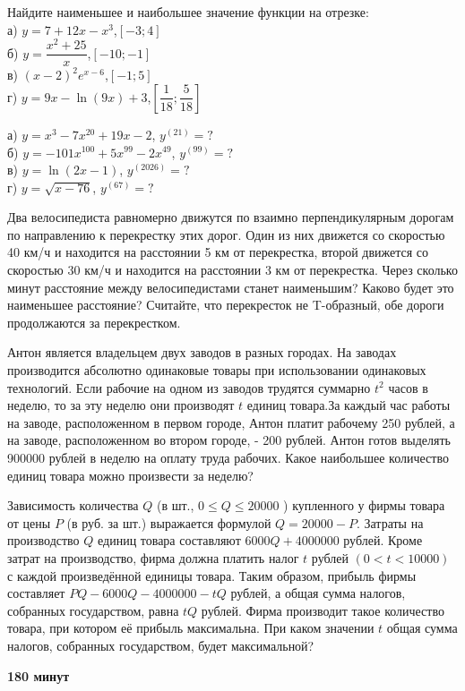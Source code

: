 \newpage


 Найдите наименьшее и наибольшее значение функции на отрезке:\\
а) $y=7+12 x-x^3$,$[-3 ; 4]$\\
б) $y=\dfrac{x^2+25}{x}$,$[-10 ; -1]$\\
в) $(x-2)^2 e^{x-6}$,$[-1 ; 5]$\\
г) $y=9 x-\ln (9 x)+3$,$\left[\dfrac{1}{18} ; \dfrac{5}{18}\right]$

 а) $y=x^3-7x^{20}+19x-2$, $y^{(21)}=?$\\
б) $y=-101x^{100}+5x^{99}-2x^{49}$, $y^{(99)}=?$ \\
в) $y=\ln (2 x-1)$, $y^{(2026)}=?$\\
г) $y=\sqrt{x-76}$, $y^{(67)}=?$

 Два велосипедиста равномерно движутся по взаимно перпендикулярным дорогам по направлению к перекрестку этих дорог. Один из них движется со скоростью 40 км/ч и находится на расстоянии 5 км от перекрестка, второй движется со скоростью 30 км/ч и находится на расстоянии 3 км от перекрестка. Через сколько минут расстояние между велосипедистами станет наименьшим? Каково будет это наименьшее расстояние? Считайте, что перекресток не T-образный, обе дороги продолжаются за перекрестком.

 Антон является владельцем двух заводов в разных городах. На заводах производится абсолютно одинаковые товары при использовании одинаковых технологий. Если рабочие на одном из заводов трудятся суммарно $t^2$ часов в неделю, то за эту неделю они производят $t$ единиц товара.За каждый час работы на заводе, расположенном в первом городе, Антон платит рабочему 250 рублей, а на заводе, расположенном во втором городе, - 200 рублей. Антон готов выделять 900000 рублей в неделю на оплату труда рабочих. Какое наибольшее количество единиц товара можно произвести за неделю?

 Зависимость количества $Q$ (в шт., $0 \leqslant Q \leqslant 20000$ ) купленного у фирмы товара от цены $P$ (в руб. за шт.) выражается формулой $Q=20000-P$. Затраты на производство $Q$ единиц товара составляют $6000 Q+4000000$ рублей. Кроме затрат на производство, фирма должна платить налог $t$ рублей $(0<t<10000)$ с каждой произведённой единицы товара. Таким образом, прибыль фирмы составляет $P Q-6000 Q-4000000-t Q$ рублей, а общая сумма налогов, собранных государством, равна $t Q$ рублей. Фирма производит такое количество товара, при котором её прибыль максимальна. При каком значении $t$ общая сумма налогов, собранных государством, будет максимальной?\\


\centerline{\textbf{180 минут}}